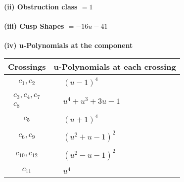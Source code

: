\documentclass[1p]{elsarticle_modified}
\theoremstyle{definition}
\begin{document}
\flushleft \textbf{(ii) Obstruction class $= 1$}\\~\\
\flushleft \textbf{(iii) Cusp Shapes $= -16 u-41$}\\~\\
\newpage\renewcommand{\arraystretch}{1}
\flushleft \textbf{(iv) u-Polynomials at the component}\newline \\
\begin{tabular}{m{50pt}|m{274pt}}
Crossings & \hspace{64pt}u-Polynomials at each crossing \\
\hline $$\begin{aligned}c_{1},c_{2}\end{aligned}$$&$\begin{aligned}
&(u-1)^4
\end{aligned}$\\
\hline $$\begin{aligned}c_{3},c_{4},c_{7}\\c_{8}\end{aligned}$$&$\begin{aligned}
&u^4+u^3+3 u-1
\end{aligned}$\\
\hline $$\begin{aligned}c_{5}\end{aligned}$$&$\begin{aligned}
&(u+1)^4
\end{aligned}$\\
\hline $$\begin{aligned}c_{6},c_{9}\end{aligned}$$&$\begin{aligned}
&(u^2+u-1)^2
\end{aligned}$\\
\hline $$\begin{aligned}c_{10},c_{12}\end{aligned}$$&$\begin{aligned}
&(u^2- u-1)^2
\end{aligned}$\\
\hline $$\begin{aligned}c_{11}\end{aligned}$$&$\begin{aligned}
&u^4
\end{aligned}$\\
\hline
\end{tabular}\\~\\
\end{document}
